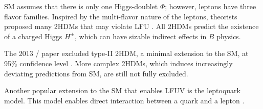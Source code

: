 SM assumes that there is only one Higgs-doublet $\Phi$; however, leptons have
three flavor families.
Inspired by the multi-flavor nature of the leptons, theorists proposed many
2HDMs that may violate LFU \cite{Branco:2011iw}.
All 2HDMs predict the existence of a charged Higgs $H^{\pm}$, which can have
sizable indirect effects in $B$ physics.

The 2013 \BaBar/ paper excluded type-II 2HDM, a minimal extension to the SM, at
95\% confidence level \cite{Lees:2013uzd}.
More complex 2HDMs, which induces increasingly deviating predictions from SM, are
still not fully excluded.

Another popular extension to the SM that enables LFUV is the leptoquark model.
This model enables direct interaction between a quark and a
lepton \cite{Faber:2018afz}.
